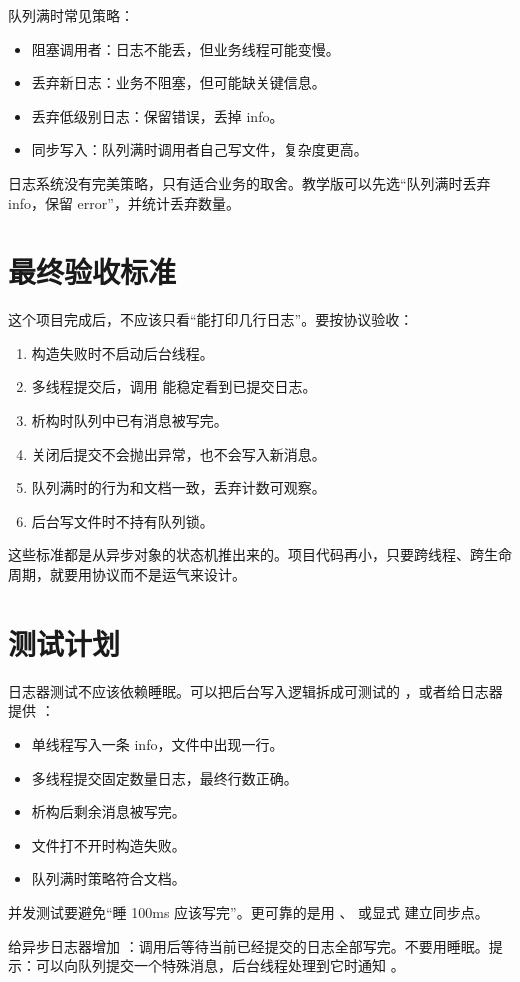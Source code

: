 队列满时常见策略：

\begin{itemize}
  \item 阻塞调用者：日志不能丢，但业务线程可能变慢。
  \item 丢弃新日志：业务不阻塞，但可能缺关键信息。
  \item 丢弃低级别日志：保留错误，丢掉 info。
  \item 同步写入：队列满时调用者自己写文件，复杂度更高。
\end{itemize}

日志系统没有完美策略，只有适合业务的取舍。教学版可以先选“队列满时丢弃 info，保留 error”，并统计丢弃数量。

\section{最终验收标准}

这个项目完成后，不应该只看“能打印几行日志”。要按协议验收：

\begin{enumerate}
  \item 构造失败时不启动后台线程。
  \item 多线程提交后，调用  能稳定看到已提交日志。
  \item 析构时队列中已有消息被写完。
  \item 关闭后提交不会抛出异常，也不会写入新消息。
  \item 队列满时的行为和文档一致，丢弃计数可观察。
  \item 后台写文件时不持有队列锁。
\end{enumerate}

这些标准都是从异步对象的状态机推出来的。项目代码再小，只要跨线程、跨生命周期，就要用协议而不是运气来设计。

\section{测试计划}

日志器测试不应该依赖睡眠。可以把后台写入逻辑拆成可测试的 ，或者给日志器提供 ：

\begin{itemize}
  \item 单线程写入一条 info，文件中出现一行。
  \item 多线程提交固定数量日志，最终行数正确。
  \item 析构后剩余消息被写完。
  \item 文件打不开时构造失败。
  \item 队列满时策略符合文档。
\end{itemize}

并发测试要避免“睡 100ms 应该写完”。更可靠的是用 、 或显式  建立同步点。

\begin{exercisebox}
给异步日志器增加 ：调用后等待当前已经提交的日志全部写完。不要用睡眠。提示：可以向队列提交一个特殊消息，后台线程处理到它时通知 。
\end{exercisebox}
